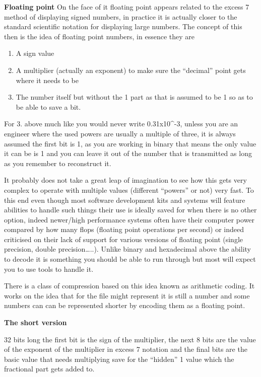 \documentclass[
]{book}
\providecommand{\tightlist}{%
  \setlength{\itemsep}{0pt}\setlength{\parskip}{0pt}}
\begin{document}
\textbf{Floating point} On the face of it floating point appears related to the excess 7 method of displaying signed numbers, in practice it is actually closer to the standard scientific notation for displaying large numbers. The concept of this then is the idea of floating point numbers, in essence they are

\begin{enumerate}
\def\labelenumi{\arabic{enumi}.}
\tightlist
\item
  A sign value
\item
  A multiplier (actually an exponent) to make sure the ``decimal'' point gets where it needs to be
\item
  The number itself but without the 1 part as that is assumed to be 1 so as to be able to save a bit.
\end{enumerate}

For 3. above much like you would never write 0.31x10\^{}-3, unless you are an engineer where the used powers are usually a multiple of three, it is always assumed the first bit is 1, as you are working in binary that means the only value it can be is 1 and you can leave it out of the number that is transmitted as long as you remember to reconstruct it.

It probably does not take a great leap of imagination to see how this gets very complex to operate with multiple values (different ``powers'' or not) very fast. To this end even though most software development kits and systems will feature abilities to handle such things their use is ideally saved for when there is no other option, indeed newer/high performance systems often have their computer power compared by how many flops (floating point operations per second) or indeed criticised on their lack of support for various versions of floating point (single precision, double precision\ldots..). Unlike binary and hexadecimal above the ability to decode it is something you should be able to run through but most will expect you to use tools to handle it.

There is a class of compression based on this idea known as arithmetic coding. It works on the idea that for the file might represent it is still a number and some numbers can can be represented shorter by encoding them as a floating point.

\textbf{The short version}

32 bits long the first bit is the sign of the multiplier, the next 8 bits are the value of the exponent of the multiplier in excess 7 notation and the final bits are the basic value that needs multiplying save for the ``hidden'' 1 value which the fractional part gets added to.
\end{document}
